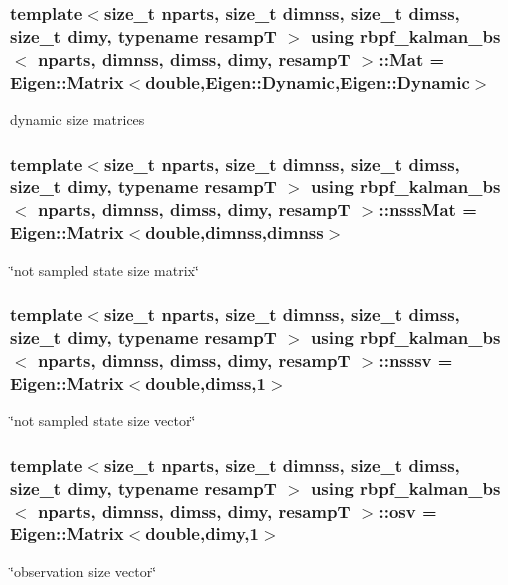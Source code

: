 \subsubsection[{\texorpdfstring{Mat}{Mat}}]{\setlength{\rightskip}{0pt plus 5cm}template$<$size\+\_\+t nparts, size\+\_\+t dimnss, size\+\_\+t dimss, size\+\_\+t dimy, typename resampT $>$ using {\bf rbpf\+\_\+kalman\+\_\+bs}$<$ nparts, dimnss, dimss, dimy, resampT $>$\+::{\bf Mat} =  Eigen\+::\+Matrix$<$double,Eigen\+::\+Dynamic,Eigen\+::\+Dynamic$>$}\hypertarget{classrbpf__kalman__bs_a070b7a6225d1eae7595454fb523fd182}{}\label{classrbpf__kalman__bs_a070b7a6225d1eae7595454fb523fd182}
dynamic size matrices 
\subsubsection[{\texorpdfstring{nsss\+Mat}{nsssMat}}]{\setlength{\rightskip}{0pt plus 5cm}template$<$size\+\_\+t nparts, size\+\_\+t dimnss, size\+\_\+t dimss, size\+\_\+t dimy, typename resampT $>$ using {\bf rbpf\+\_\+kalman\+\_\+bs}$<$ nparts, dimnss, dimss, dimy, resampT $>$\+::{\bf nsss\+Mat} =  Eigen\+::\+Matrix$<$double,dimnss,dimnss$>$}\hypertarget{classrbpf__kalman__bs_ad20086b480fa12e9179a573c4b47818f}{}\label{classrbpf__kalman__bs_ad20086b480fa12e9179a573c4b47818f}
\char`\"{}not sampled state size matrix\char`\"{} 
\subsubsection[{\texorpdfstring{nsssv}{nsssv}}]{\setlength{\rightskip}{0pt plus 5cm}template$<$size\+\_\+t nparts, size\+\_\+t dimnss, size\+\_\+t dimss, size\+\_\+t dimy, typename resampT $>$ using {\bf rbpf\+\_\+kalman\+\_\+bs}$<$ nparts, dimnss, dimss, dimy, resampT $>$\+::{\bf nsssv} =  Eigen\+::\+Matrix$<$double,dimss,1$>$}\hypertarget{classrbpf__kalman__bs_a8ce938ee1e02c5766ad15c1aca4e7796}{}\label{classrbpf__kalman__bs_a8ce938ee1e02c5766ad15c1aca4e7796}
\char`\"{}not sampled state size vector\char`\"{} 
\subsubsection[{\texorpdfstring{osv}{osv}}]{\setlength{\rightskip}{0pt plus 5cm}template$<$size\+\_\+t nparts, size\+\_\+t dimnss, size\+\_\+t dimss, size\+\_\+t dimy, typename resampT $>$ using {\bf rbpf\+\_\+kalman\+\_\+bs}$<$ nparts, dimnss, dimss, dimy, resampT $>$\+::{\bf osv} =  Eigen\+::\+Matrix$<$double,dimy,1$>$}\hypertarget{classrbpf__kalman__bs_a87690d6ffb54ffb4b76dc2de7fd415d5}{}\label{classrbpf__kalman__bs_a87690d6ffb54ffb4b76dc2de7fd415d5}
\char`\"{}observation size vector\char`\"{} 
